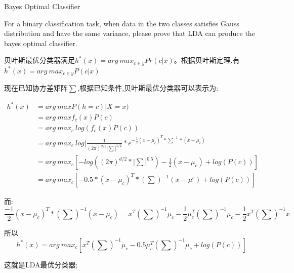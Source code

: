 \documentclass[11pt, a4paper, UTF8]{ctexart}
\begin{document}
\begin{problem}[ML problem 2]
	[20pts] Bayes Optimal Classifier

	For a binary classification task, when data in the two classes satisfies Gauss distribution and have the same variance, please prove that LDA can produce the bayes optimal classifier.
\end{problem}
\begin{solution}

	贝叶斯最优分类器满足$h^*(x)=arg~max_{c\in y}Pr(c|x)$。根据贝叶斯定理,有$h^*(x)=arg~max_{c\in y} P(c|x) $

	现在已知协方差矩阵$\sum$,根据已知条件,贝叶斯最优分类器可以表示为:

	\begin{equation*}
		\begin{aligned}
			h^*(x)&=arg ~ max P(h=c)|X=x)
						\\&=arg~max f_c(x)P(c)
						\\&=arg~max_{c}~log(f_c(x)P(c))
						\\&=arg~max_{c} ~ log[\frac{1}{(2\pi)^{d/2}|\sum|^{1/2}}*e^{-\frac{1}{2}(x-\mu_c)^T*\sum ^{-1}*(x-\mu_c)}
						\\&=arg~max_{c}[-log((2\pi)^{d/2}*|\sum|^{0.5})-\frac{1}{2}(x-\mu_c)+log(P(c))]
						\\&=arg~max_c [-0.5*(x-\mu_c)^T*(\sum)^{-1}(x-\mu^c)+log (P(c))]
		\end{aligned}
	\end{equation*}

	而:$$\frac{-1}{2}(x-\mu_c)^T*(\sum)^{-1}(x-\mu_c)=x^T(\sum)^{-1}\mu_c-\frac{1}{2}\mu_c^T(\sum) ^{-1}\mu_c-\frac{1}{2}x^T(\sum)^{-1}x$$

	所以 $$h^*(x)=arg~max_{c}[x^T(\sum)^{-1}\mu_c-0.5\mu_c ^T(\sum)^{-1}\mu_c +log (P(c))]$$

	这就是LDA最优分类器;
\end{solution}
\end{document}
